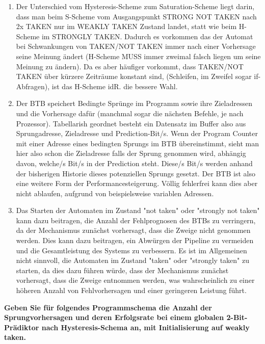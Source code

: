 \documentclass[11pt]{article}
\newcommand{\aufgabe}[1]{\item{\bf #1}}
\begin{document}
\begin{enumerate}
    \item Der Unterschied vom Hysteresis-Scheme zum Saturation-Scheme liegt darin, dass man beim S-Scheme vom Ausgangspunkt STRONG NOT TAKEN nach 2x TAKEN nur im WEAKLY TAKEN Zustand landet, statt wie beim H-Scheme im STRONGLY TAKEN. Dadurch es vorkommen das der Automat bei Schwankungen von TAKEN/NOT TAKEN immer nach einer Vorhersage seine Meinung ändert (H-Scheme MUSS immer zweimal falsch liegen um seine Meinung zu ändern). Da es aber häufiger vorkommt, dass TAKEN/NOT TAKEN über kürzere Zeiträume konstant sind, (Schleifen, im Zweifel sogar if-Abfragen), ist das H-Scheme idR. die bessere Wahl.
    \item Der BTB speichert Bedingte Sprünge im Programm sowie ihre Zieladressen und die Vorhersage dafür (manchmal sogar die nächsten Befehle, je nach Prozessor). Tabellarish geordnet besteht ein Datensatz im Buffer also aus Sprungadresse, Zieladresse und Prediction-Bit/s. Wenn der Program Counter mit einer Adresse eines bedingten Sprungs im BTB übereinstimmt, sieht man hier also schon die Zieladresse falls der Sprung genommen wird, abhängig davon, welche/s Bit/s in der Prediction steht. Diese/s Bit/s werden anhand der bisherigen Historie dieses potenziellen Sprungs gesetzt. Der BTB ist also eine weitere Form der Performancesteigerung. Völlig fehlerfrei kann dies aber nicht ablaufen, aufgrund von beispielsweise variablen Adressen.
    \item Das Starten der Automaten im Zustand "not taken" oder "strongly not taken" kann dazu beitragen, die Anzahl der Fehlprognosen des BTBs zu verringern, da der Mechanismus zunächst vorhersagt, dass die Zweige nicht genommen werden. Dies kann dazu beitragen, ein Abwürgen der Pipeline zu vermeiden und die Gesamtleistung des Systems zu verbessern. Es ist im Allgemeinen nicht sinnvoll, die Automaten im Zustand "taken" oder "strongly taken" zu starten, da dies dazu führen würde, dass der Mechanismus zunächst vorhersagt, dass die Zweige entnommen werden, was wahrscheinlich zu einer höheren Anzahl von Fehlvorhersagen und einer geringeren Leistung führt.
\end{enumerate}
\aufgabe{Geben Sie für folgendes Programmschema die Anzahl der Sprungvorhersagen und deren Erfolgsrate bei einem globalen 2-Bit-Prädiktor nach Hysteresis-Schema an, mit Initialisierung auf \glqq weakly taken\grqq{}.}\\
\end{document}
